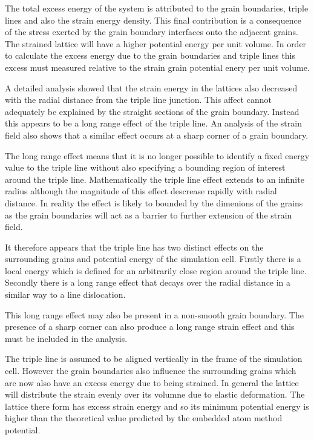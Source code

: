 \documentclass[12pt,a4paper]{book}
\begin{document}
The total excess energy of the system is attributed to the grain boundaries, triple lines and also the strain energy density. This final contribution is a consequence of the stress exerted by the grain boundary interfaces onto the adjacent grains. The strained lattice will have a higher potential energy per unit volume. In order to calculate the excess energy due to the grain boundaries and triple lines this excess must measured relative to the strain grain potential enery per unit volume. 

A detailed analysis showed that the strain energy in the lattices also decreased with the radial distance from the triple line junction. This affect cannot adequately be explained by the straight sections of the grain boundary. Instead this appears to be a long range effect of the triple line. An analysis of the strain field also shows that a similar effect occurs at a sharp corner of a grain boundary.
 
The long range effect means that it is no longer possible to identify a fixed energy value to the triple line without also specifying a bounding region of interest around the triple line. Mathematically the triple line effect extends to an infinite radius although the magnitude of this effect descrease rapidly with radial distance. In reality the effect is likely to bounded by the dimenions of the grains as the grain boundaries will act as a barrier to further extension of the strain field. 

It therefore appears that the triple line has two distinct effects on the surrounding grains and potential energy of the simulation cell. Firstly there is a local energy which is defined for an arbitrarily close region around the triple line. Secondly there is a long range effect that decays over the radial distance in a similar way to a line dislocation.

This long range effect may also be present in a non-smooth grain boundary. The presence of a sharp corner can also produce a long range strain effect and this must be included in the analysis.

The triple line is assumed to be aligned vertically in the frame of the simulation cell. However the grain boundaries also influence the surrounding grains which are now also have an excess energy due to being strained. In general the lattice will distribute the strain evenly over its volumne due to elastic deformation. The lattice there form has excess strain energy and so its minimum  potential energy is higher than the theoretical value predicted by the embedded atom method potential.
\end{document}
